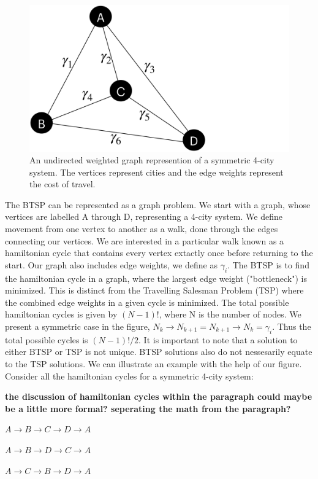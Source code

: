 \documentclass[twocolumn,showpacs,preprintnumbers,amsmath,amssymb]{revtex4}
\begin{document}
		\begin{figure}[!h]
			\centering
			\includegraphics[trim={0 0 21.9cm 0},clip, width=0.7 \linewidth]{"graphics/4-city"}
			\caption{An undirected weighted graph represention of a  symmetric 4-city system.  The vertices represent cities and the edge weights represent the cost of travel. }
			\label{fig:4-city-graphic}
		\end{figure}		
		
		
		
		
		The BTSP can be represented as a graph problem.  We start with a graph, whose vertices are labelled A through D, representing a 4-city system. We define movement from one vertex to another as a walk, done through the edges connecting our vertices. We are interested in a particular walk known as a hamiltonian cycle that contains every vertex extactly once before returning to the start. Our graph also includes edge weights, we define as $ \gamma_i $.
		The BTSP is to find the hamiltonian cycle in a graph, where the largest edge weight ("bottleneck") is minimized. This is distinct from the Travelling Salesman Problem (TSP) where the combined edge weights in a given cycle is minimized. The total possible hamiltonian cycles is given by $(N-1)!$, where N is the number of nodes. We present a symmetric case in the figure,  $N_k \rightarrow N_{k+1} = N_{k+1} \rightarrow N_{k} = \gamma_i$. Thus the total possible cycles is  $(N-1)!/2$.  It is important to note that a solution to either BTSP or TSP is not unique. BTSP solutions also do not nessesarily equate to the TSP solutions. We can illustrate an example with the help of our figure. Consider all the hamiltonian cycles for a symmetric 4-city system:
		
		\textbf{the discussion of hamiltonian cycles within the paragraph could maybe be a little more formal? seperating the math from the paragraph?} 
		
		\begin{center}
		$ A \rightarrow B \rightarrow C \rightarrow D \rightarrow A $
		
		$ A \rightarrow B \rightarrow D \rightarrow C \rightarrow A $ 
		
		$ A \rightarrow C \rightarrow B \rightarrow D \rightarrow A $
	    \end{center}
		
\end{document}
